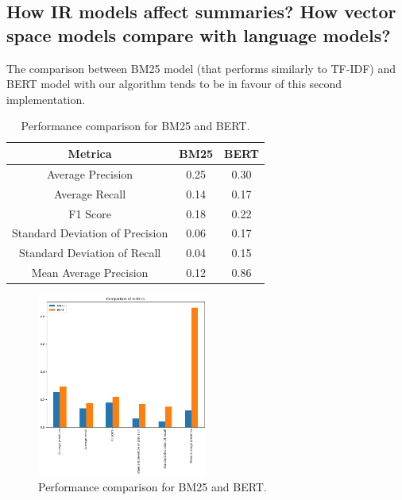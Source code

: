 \subsection{How IR models affect summaries? How vector space models compare with language models?}
The comparison between BM25 model (that performs similarly to TF-IDF) and BERT model with our algorithm tends to be in favour of this second implementation. 
\begin{table}[h]
    \centering
    \begin{tabular}{|c|c|c|}
    \hline
    Metrica & BM25 & BERT \\
    \hline
    Average Precision & 0.25 & 0.30 \\
    Average Recall & 0.14 & 0.17 \\
    F1 Score & 0.18 & 0.22 \\
    Standard Deviation of Precision & 0.06 & 0.17 \\
    Standard Deviation of Recall & 0.04 & 0.15 \\
    Mean Average Precision & 0.12 & 0.86 \\
    \hline
    \end{tabular}
    \caption{Performance comparison for BM25 and BERT.}
    \label{tab:my-table}
\end{table}
\begin{figure}[h]
    \centering
    \includegraphics[width=0.5\textwidth]{images/bm25_bert.png}
    \caption{Performance comparison for BM25 and BERT.}
    \label{fig:bm25_bert}
\end{figure}


